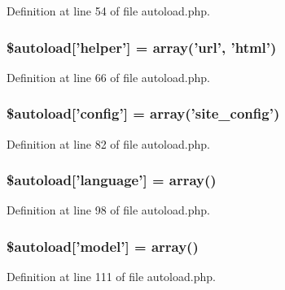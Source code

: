Definition at line 54 of file autoload.\-php.

\hypertarget{autoload_8php_aa98014ce8ad854ad9500e65ff159272d}{
\subsubsection[{\$autoload}]{\setlength{\rightskip}{0pt plus 5cm}\$autoload\mbox{[}'helper'\mbox{]} = array('url', 'html')}}\label{autoload_8php_aa98014ce8ad854ad9500e65ff159272d}


Definition at line 66 of file autoload.\-php.

\hypertarget{autoload_8php_ac051887e192979c0320e05821bad8f33}{
\subsubsection[{\$autoload}]{\setlength{\rightskip}{0pt plus 5cm}\$autoload\mbox{[}'config'\mbox{]} = array('site\-\_\-config')}}\label{autoload_8php_ac051887e192979c0320e05821bad8f33}


Definition at line 82 of file autoload.\-php.

\hypertarget{autoload_8php_addfee4f4b38a8235172cb173995a9c0b}{
\subsubsection[{\$autoload}]{\setlength{\rightskip}{0pt plus 5cm}\$autoload\mbox{[}'language'\mbox{]} = array()}}\label{autoload_8php_addfee4f4b38a8235172cb173995a9c0b}


Definition at line 98 of file autoload.\-php.

\hypertarget{autoload_8php_a942b884082b1defda7fb10ee71bba324}{
\subsubsection[{\$autoload}]{\setlength{\rightskip}{0pt plus 5cm}\$autoload\mbox{[}'model'\mbox{]} = array()}}\label{autoload_8php_a942b884082b1defda7fb10ee71bba324}


Definition at line 111 of file autoload.\-php.

